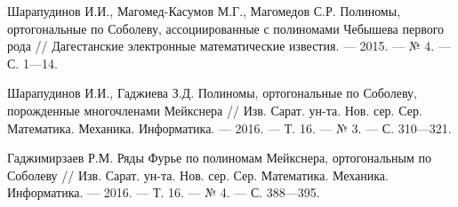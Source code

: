\begin{thebibliography}{99}
Шарапудинов И.И., Магомед-Касумов М.Г., Магомедов С.Р. Полиномы, ортогональные по Соболеву, ассоциированные с полиномами Чебышева первого рода // Дагестанские электронные математические известия. --- 2015. --- № 4. --- С. 1---14.










Шарапудинов И.И., Гаджиева  З.Д. Полиномы, ортогональные по Соболеву, порожденные многочленами Мейкснера // Изв. Сарат. ун-та. Нов. сер. Сер. Математика. Механика. Информатика. --- 2016. --- Т. 16. --- № 3. --- С. 310---321.










Гаджимирзаев Р.М. Ряды Фурье по полиномам Мейкснера, ортогональным по Соболеву // Изв. Сарат. ун-та. Нов. сер. Сер. Математика. Механика. Информатика. --- 2016. --- Т. 16. --- № 4. --- С. 388---395.






\end{thebibliography} 